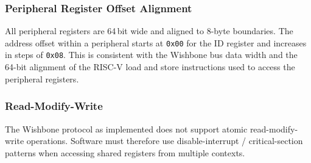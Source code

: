 \subsubsection{Peripheral Register Offset Alignment}

All peripheral registers are 64\,bit wide and aligned to 8-byte boundaries.
The address offset within a peripheral starts at \texttt{0x00} for the
ID register and increases in steps of \texttt{0x08}.
This is consistent with the Wishbone bus data width and the 64-bit
alignment of the RISC-V load and store instructions used to access the
peripheral registers.

\subsubsection{Read-Modify-Write}

The Wishbone protocol as implemented does not support atomic
read-modify-write operations.
Software must therefore use disable-interrupt / critical-section
patterns when accessing shared registers from multiple contexts.
